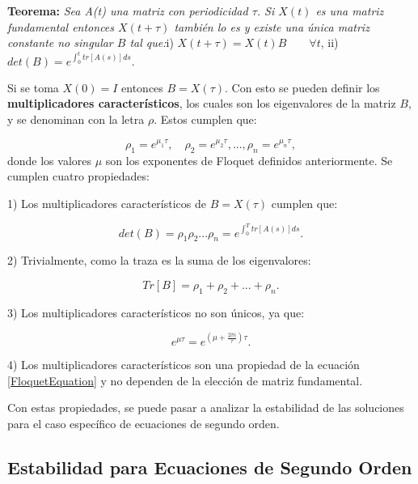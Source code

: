 \documentclass[a4paper,10pt]{report}
\begin{document}
\begin{center}
\textbf{Teorema:} \textit{Sea A(t) una matriz con periodicidad $\tau$. Si $X(t)$ es una matriz fundamental entonces $X(t+\tau)$ también lo es y existe una única matriz constante no singular $B$ tal que:}\linebreak \linebreak i) $X(t+\tau) = X(t)B \qquad\forall t$, \linebreak ii) $det(B) = e^{\int_0^t tr[A(s)]ds}.$
\end{center}Si se toma $X(0)=I$ entonces $B=X(\tau)$. Con esto se pueden definir los \textbf{multiplicadores característicos}, los cuales son los eigenvalores de la matriz $B$, y se denominan con la letra $\rho$. Estos cumplen que:

\begin{equation}
\rho_1 = e^{\mu_1 \tau}, \quad \rho_2 = e^{\mu_2 \tau}, ... , \rho_n = e^{\mu_n \tau},
\end{equation} donde los valores $\mu$ son los exponentes de Floquet definidos anteriormente. Se cumplen cuatro propiedades:

1) Los multiplicadores característicos de $B=X(\tau)$ cumplen que:

\begin{equation}
det(B) = \rho_1 \rho_2 ... \rho_n = e^{\int_0^T tr[A(s)]ds}.
\end{equation}

2) Trivialmente, como la traza es la suma de los eigenvalores:

\begin{equation}
Tr[B] = \rho_1 + \rho_2 + ... + \rho_n.
\end{equation}

3) Los multiplicadores característicos no son únicos, ya que:

\begin{equation}
e^{\mu \tau} = e^{(\mu  +\frac{2\pi i}{\tau} )\tau}.
\end{equation}

4) Los multiplicadores característicos son una propiedad de la ecuación \ref{FloquetEquation} y no dependen de la elección de matriz fundamental.

Con estas propiedades, se puede pasar a analizar la estabilidad de las soluciones para el caso específico de ecuaciones de segundo orden.

\subsection{Estabilidad para Ecuaciones de Segundo Orden}\label{EstabilidadSO}
\end{document}
